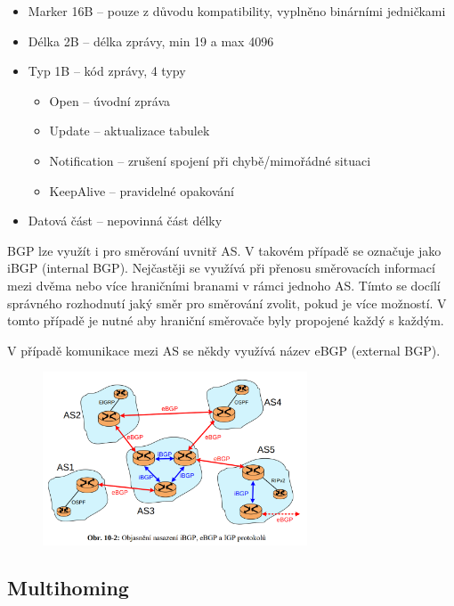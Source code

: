 \begin{itemize}[noitemsep]
    \item Marker 16B -- pouze z důvodu kompatibility, vyplněno binárními jedničkami
    \item Délka 2B -- délka zprávy, min 19 a max 4096
    \item Typ 1B -- kód zprávy, 4 typy
    \begin{itemize}[noitemsep]
        \item Open -- úvodní zpráva
        \item Update -- aktualizace tabulek
        \item Notification -- zrušení spojení při chybě/mimořádné situaci
        \item KeepAlive -- pravidelné opakování
    \end{itemize}
    \item Datová část -- nepovinná část délky
\end{itemize}



BGP lze využít i pro směrování uvnitř AS.
V takovém případě se označuje jako iBGP (internal BGP).
Nejčastěji se využívá při přenosu směrovacích informací mezi dvěma nebo více hraničními branami v rámci jednoho AS.
Tímto se docílí správného rozhodnutí jaký směr pro směrování zvolit, pokud je více možností.
V tomto případě je nutné aby hraniční směrovače byly propojené každý s každým.

V případě komunikace mezi AS se někdy využívá název eBGP (external BGP).

\begin{figure}[!h]
    \centering
    \includegraphics[width=0.7\textwidth]{obrazky/090.png}
\end{figure}


\subsection{Multihoming}

